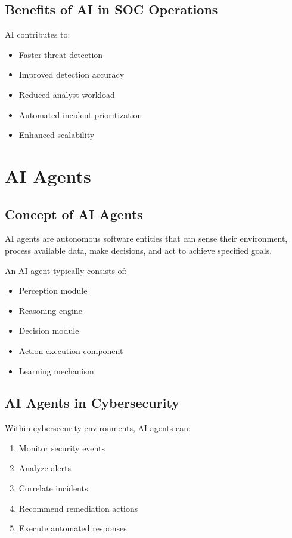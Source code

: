 \documentclass[12pt,a4paper]{report}
\begin{document}
\subsection{Benefits of AI in SOC Operations}
AI contributes to:
\begin{itemize}
    \item Faster threat detection
    \item Improved detection accuracy
    \item Reduced analyst workload
    \item Automated incident prioritization
    \item Enhanced scalability
\end{itemize}

\section{AI Agents}
\label{sec:ai_agents}

\subsection{Concept of AI Agents}
AI agents are autonomous software entities that can sense their environment, process available data, make decisions, and act to achieve specified goals.

An AI agent typically consists of:
\begin{itemize}
    \item Perception module
    \item Reasoning engine
    \item Decision module
    \item Action execution component
    \item Learning mechanism
\end{itemize}

\subsection{AI Agents in Cybersecurity}
Within cybersecurity environments, AI agents can:
\begin{enumerate}[label=\arabic*.]
    \item Monitor security events
    \item Analyze alerts
    \item Correlate incidents
    \item Recommend remediation actions
    \item Execute automated responses
\end{enumerate}
\end{document}
